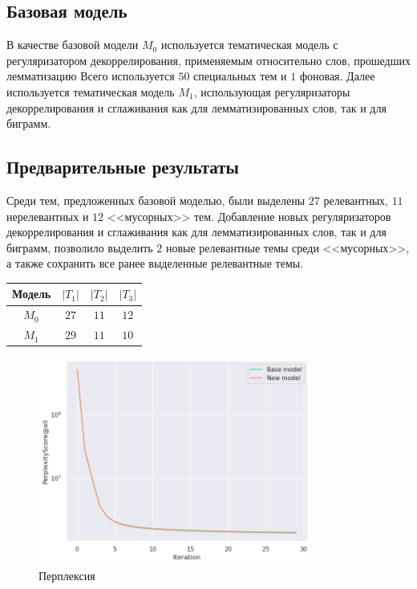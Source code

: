 \documentclass{article}
\begin{document}

\subsection{Базовая модель}


В качестве базовой модели $M_0$ используется тематическая модель с регуляризатором декоррелирования, применяемым относительно слов, прошедших лемматизацию
Всего используется $50$ специальных тем и $1$ фоновая.
Далее используется тематическая модель $M_1$, использующая регуляризаторы декоррелирования и сглаживания как для лемматизированных слов, так и для биграмм.

\subsection{Предварительные результаты}

Среди тем, предложенных базовой моделью, были выделены $27$ релевантных, $11$ нерелевантных и $12$ <<мусорных>> тем.
Добавление новых регуляризаторов декоррелирования и сглаживания как для лемматизированных слов, так и для биграмм, позволило выделить $2$ новые релевантные темы среди <<мусорных>>, а также сохранить все ранее выделенные релевантные темы.


\begin{center}
    \begin{tabular}{c|c|c|c|}
        Модель & $|T_1|$ & $|T_2|$ & $|T_3|$ \\
        \hline
        $M_0$ & $27$ & $11$ & $12$ \\
        $M_1$ & $29$ & $11$ & $10$
    \end{tabular}
\end{center}

\begin{figure}[h]
\includegraphics[width=9cm]{figures/perplexity_all.png}
\centering
\caption{Перплексия}
\end{figure}
\end{document}
